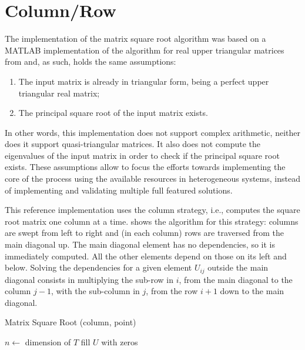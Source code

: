 \documentclass[../thesis]{subfiles}
\begin{document}
	\section{Column/Row}
	\label{sec:multicore:column}
	The implementation of the matrix square root algorithm was based on a MATLAB implementation of the algorithm for real upper triangular matrices from \cite{Deadman:Higham:Ralha:2013} and, as such, holds the same assumptions:
		\begin{enumerate}
			\item The input matrix is already in triangular form, being a perfect upper triangular real matrix;
			\item The principal square root of the input matrix exists.
		\end{enumerate}
	In other words, this implementation does not support complex arithmetic, neither does it support quasi-triangular matrices. It also does not compute the eigenvalues of the input matrix in order to check if the principal square root exists. These assumptions allow to focus the efforts towards implementing the core of the process using the available resources in heterogeneous systems, instead of implementing and validating multiple full featured solutions.

	This reference implementation uses the column strategy, i.e., computes the square root matrix one column at a time.  shows the algorithm for this strategy: columns are swept from left to right and (in each column) rows are traversed from the main diagonal up. The main diagonal element has no dependencies, so it is immediately computed. All the other elements depend on those on its left and below. Solving the dependencies for a given element $U_{ij}$ outside the main diagonal consists in multiplying the sub-row in $i$, from the main diagonal to the column $j-1$, with the sub-column in $j$, from the row $i+1$ down to the main diagonal.

	\begin{algorithm}[htp]
		\caption{Matrix Square Root (column, point)}
		\label{alg:sqrtm:column:point}
		\DontPrintSemicolon


		$n \leftarrow$ dimension of $T$\;
		fill $U$ with zeros\;

	\end{algorithm}
\end{document}
